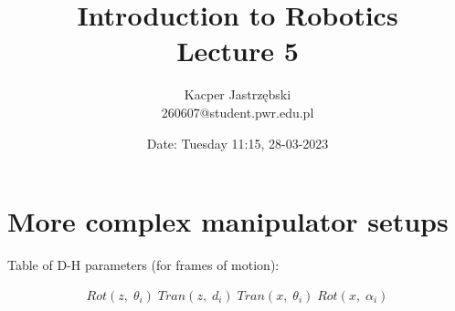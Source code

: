 \documentclass[12pt, a4paper]{extarticle}
\title{
	Introduction to Robotics \\
	\vspace{\baselineskip}
	\large
	\textbf{Lecture 5}
}
\author{
	Kacper Jastrzębski\\
	260607@student.pwr.edu.pl
}
\date{Date: Tuesday 11:15, 28-03-2023}
\begin{document}
	\maketitle
	\vspace{1.5cm}

	\tableofcontents

	\pagebreak

	\section{More complex manipulator setups}


	Table of D-H parameters (for frames of motion):

	\begin{table}[H]
		\centering
	\end{table}


	\begin{align}
		Rot(z,\; \theta_i) \; Tran(z,\; d_i) \; Tran(x,\; \theta_i) \; Rot(x,\; \alpha_i)
	\end{align}

\end{document}
